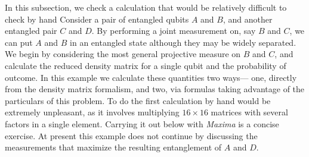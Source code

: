 \documentclass[leqno,10pt]{article}
\newcommand{\pname}[1]{{\it #1}} %
\begin{document}
In this subsection, we check a calculation that would
be relatively difficult to check by hand
Consider a pair of entangled qubits $A$ and $B$, and another
entangled pair $C$ and $D$. By performing a joint
measurement on, say $B$ and $C$, we can put $A$ and $B$ in
an entangled state although they may be widely separated.
We begin by considering the most general projective measure
on $B$ and $C$, and calculate the reduced density matrix for
a single qubit and the probability of outcome. In this
example we calculate these quantities two ways--- one,
directly from the density matrix formalism, and two, via
formulas taking advantage of the particulars of this
problem. To do the first calculation by hand would be
extremely unpleasant, as it involves multiplying $16\times16$
matrices with several factors in a single element. Carrying
it out below with \pname{Maxima} is a concise exercise.
 At present this example does not continue by discussing
the measurements that maximize the resulting entanglement
of $A$ and $D$.
\end{document}
